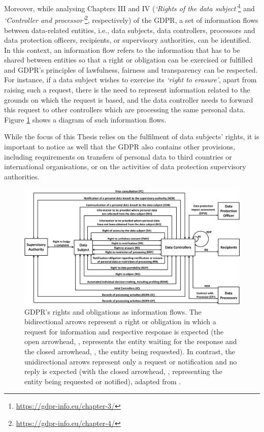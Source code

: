 Moreover, while analysing Chapters III and IV (\textit{`Rights of the data subject'}\footnote{\url{https://gdpr-info.eu/chapter-3/}} and \textit{`Controller and processor'}\footnote{\url{https://gdpr-info.eu/chapter-4/}}, respectively) of the GDPR, a set of information flows between data-related entities, i.e., data subjects, data controllers, processors and data protection officers, recipients, or supervisory authorities, can be identified.
In this context, an information flow refers to the information that has to be shared between entities so that a right or obligation can be exercised or fulfilled and GDPR's principles of lawfulness, fairness and transparency can be respected.
For instance, if a data subject wishes to exercise its \textit{`right to erasure'}, apart from raising such a request, there is the need to represent information related to the grounds on which the request is based, and the data controller needs to forward this request to other controllers which are processing the same personal data.
Figure \ref{fig:gdpr_information_flows} shows a diagram of such information flows.

While the focus of this Thesis relies on the fulfilment of data subjects' rights, it is important to notice as well that the GDPR also contains other provisions, including requirements on transfers of personal data to third countries or international organisations, or on the activities of data protection supervisory authorities.

\begin{landscape}
\begin{figure}
    \centering
    \includegraphics[width=\linewidth]{figures/chapter-1/information flow diagram.png}
    \caption[GDPR's rights and obligations as information flows.]{GDPR's rights and obligations as information flows. The bidirectional arrows represent a right or obligation in which a request for information and respective response is expected (the open arrowhead, , represents the entity waiting for the response and the closed arrowhead, , the entity being requested). In contrast, the unidirectional arrows represent only a request or notification and no reply is expected (with the closed arrowhead, , representing the entity being requested or notified), adapted from \cite{esteves_analysis_2022}.}
    \label{fig:gdpr_information_flows}
\end{figure}
\end{landscape}


